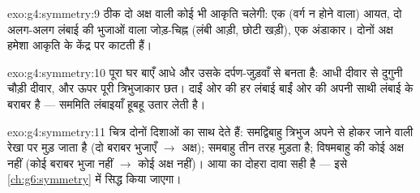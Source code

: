 \begin{solution}{exo:g4:symmetry:9}
ठीक दो अक्ष वाली कोई भी आकृति चलेगी: एक (वर्ग न होने वाला) आयत,
दो अलग-अलग लंबाई की भुजाओं वाला जोड़-चिह्न (लंबी आड़ी, छोटी
खड़ी), एक अंडाकार। दोनों अक्ष हमेशा आकृति के केंद्र पर
काटती हैं।
\end{solution}

\begin{solution}{exo:g4:symmetry:10}
पूरा घर बाएँ आधे और उसके दर्पण-जुड़वाँ से बनता है: आधी दीवार से
दुगुनी चौड़ी दीवार, और ऊपर पूरी त्रिभुजाकार छत। दाईं ओर की हर
लंबाई बाईं ओर की अपनी साथी लंबाई के बराबर है --- सममिति
लंबाइयाँ हूबहू उतार लेती है।
\end{solution}

\begin{solution}{exo:g4:symmetry:11}
चित्र दोनों दिशाओं का साथ देते हैं: समद्विबाहु त्रिभुज अपने
 से होकर जाने वाली रेखा पर मुड़ जाता है (दो बराबर भुजाएँ
$\to$ अक्ष); समबाहु तीन तरह मुड़ता है; विषमबाहु की कोई अक्ष नहीं
(कोई बराबर भुजा नहीं $\to$ कोई अक्ष नहीं)। आया का दोहरा दावा सही
है --- इसे \cref{ch:g6:symmetry} में सिद्ध किया जाएगा।
\end{solution}
